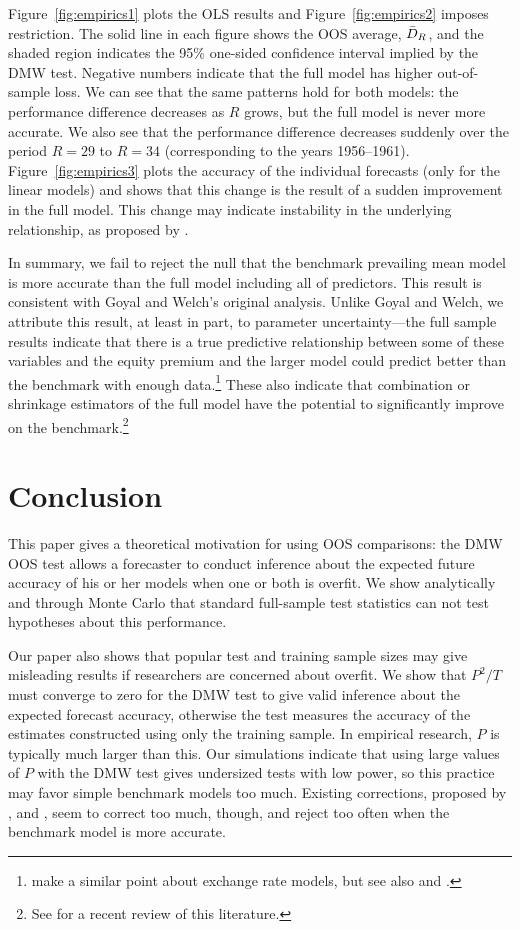 \documentclass[12pt,draft]{article}
\begin{document}
Figure~\ref{fig:empirics1} plots the OLS results and
Figure~\ref{fig:empirics2} imposes  restriction. The
solid line in each figure shows the OOS average, $\bar{D}_{R}$, and the
shaded region indicates the 95\% one-sided confidence interval implied
by the DMW test.  Negative numbers indicate that the full model has
higher out-of-sample loss.  We can see that the same patterns hold for
both models: the performance difference decreases as $R$ grows, but
the full model is never more accurate.  We also see that the
performance difference decreases suddenly over the period $R=29$ to
$R=34$ (corresponding to the years 1956--1961).
Figure~\ref{fig:empirics3} plots the accuracy of the individual
forecasts (only for the linear models) and shows that this change is
the result of a sudden improvement in the full model.  This change may
indicate instability in the underlying relationship, as proposed by
\citet{GoW:08}.

In summary, we fail to reject the null that the benchmark prevailing
mean model is more accurate than the full model including all of
 predictors.  This result is consistent with Goyal and
Welch's original analysis.  Unlike Goyal and Welch, we attribute this
result, at least in part, to parameter uncertainty---the full sample
results indicate that there is a true predictive relationship between
some of these variables and the equity premium and the larger model
could predict better than the benchmark with enough data.\footnote{%
  \citet{BWB:10} make a similar point about exchange rate models, but
  see also \citet{Chi:10} and \citet{Gia:10}.} %
These also indicate that combination or shrinkage estimators of the
full model have the potential to significantly improve on the
benchmark.\footnote{%
  See \citet{RaZ:12} for a recent review of this literature.} %

\section{Conclusion}
\label{sec:conclusion}

This paper gives a theoretical motivation for using OOS comparisons:
the DMW OOS test allows a forecaster to conduct inference about
the expected future accuracy of his or her models when one or both is
overfit.  We show analytically and through Monte Carlo that standard
full-sample test statistics can not test hypotheses about this
performance.

Our paper also shows that popular test and training sample sizes may
give misleading results if researchers are concerned about overfit.
We show that $P^2/T$ must converge to zero for the DMW test to give
valid inference about the expected forecast accuracy, otherwise the
test measures the accuracy of the estimates constructed using only the
training sample.  In empirical research, $P$ is typically much larger
than this.  Our simulations indicate that using large values of $P$
with the DMW test gives undersized tests with low power, so this
practice may favor simple benchmark models too much.  Existing
corrections, proposed by \citet{ClM:01,ClM:05}, \citet{Mcc:07} and
\citet{ClW:06,ClW:07}, seem to correct too much, though, and reject
too often when the benchmark model is more accurate.
\end{document}
